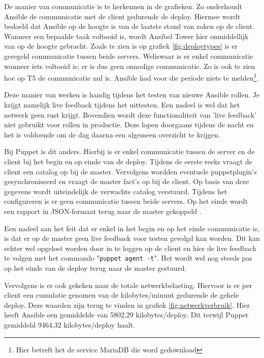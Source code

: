 De manier van communicatie is te herkennen in de grafieken. Zo onderhoudt Ansible de communicatie met de client gedurende de deploy. Hiermee wordt bedoeld dat Ansible op de hoogte is van de laatste stand van zaken op de client. Wanneer een bepaalde taak voltooid is, wordt Ansibel Tower hier onmiddellijk van op de hoogte gebracht. Zoals te zien is op grafiek \ref{fig:deploytypes} is er geregeld communicatie tussen beide servers. Weliswaar is er enkel communicatie wanneer iets voltooid is; er is dus geen onnodige communicatie. Zo is ook te zien hoe op T5 de communicatie nul is. Ansible had voor die periode niets te melden\footnote{Hier betreft het de service MariaDB die word gedownload}. 

Deze manier van werken is handig tijdens het testen van nieuwe Ansible rollen. Je krijgt namelijk live feedback tijdens het uittesten. Een nadeel is wel dat het netwerk geen rust krijgt. Bovendien wordt deze functionaliteit van 'live feedback' niet gebruikt voor rollen in productie. Deze lopen doorgaans tijdens de nacht en het is voldoende om de dag daarna een algemeen overzicht te krijgen. 

Bij Puppet is dit anders. Hierbij is er enkel communicatie tussen de server en de client bij het begin en op einde van de deploy.  Tijdens de eerste reeks vraagt de client een \gls{catalog} op bij de master. Vervolgens wordden eventuele \gls{puppetplugin}'s gesynchroniseerd en vraagt de master \gls{fact}'s op bij de client. Op basis van deze gegevens wordt uiteindelijk de verwachte \gls{catalog} verstuurd. Tijdens het configureren is er geen communicatie tussen beide servers. Op het einde wordt een rapport in JSON-formaat terug naar de master gekoppeld \autocite{neworkusage}.
 
Een nadeel aan het feit dat er enkel in het begin en op het einde communicatie is, is dat er op de master geen live feedback voor testen gevolgd kan worden. Dit kan echter wel opgelost worden door in te loggen op de client en hier de live feedback te volgen met het commando "\texttt{puppet agent -t}". Het wordt wel nog steeds pas op het einde van de deploy terug naar de master gestuurd.

Vervolgens is er ook gekeken naar de totale netwerkbelasting. Hiervoor is er per client een cumulatie genomen van de kilobytes/minuut gedurende de gehele deploy. Deze waarden zijn terug te vinden in grafiek \ref{fig:netwerkverbruik}. Hier heeft Ansible een gemiddelde van 5802,29 kilobytes/deploy. Dit terwijl Puppet gemiddeld 9464,32 kilobytes/deploy haalt. 

